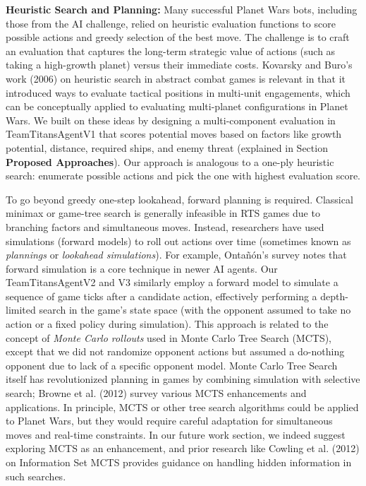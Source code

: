 \documentclass[conference]{IEEEtran}
\begin{document}
\textbf{Heuristic Search and Planning:} Many successful Planet Wars bots, including those from the AI challenge, relied on heuristic evaluation functions to score possible actions and greedy selection of the best move. The challenge is to craft an evaluation that captures the long-term strategic value of actions (such as taking a high-growth planet) versus their immediate costs. Kovarsky and Buro's work (2006) \cite{kovarsky2006} on heuristic search in abstract combat games is relevant in that it introduced ways to evaluate tactical positions in multi-unit engagements, which can be conceptually applied to evaluating multi-planet configurations in Planet Wars. We built on these ideas by designing a multi-component evaluation in TeamTitansAgentV1 that scores potential moves based on factors like growth potential, distance, required ships, and enemy threat (explained in Section \textbf{Proposed Approaches}). Our approach is analogous to a one-ply heuristic search: enumerate possible actions and pick the one with highest evaluation score.

To go beyond greedy one-step lookahead, forward planning is required. Classical minimax or game-tree search is generally infeasible in RTS games due to branching factors and simultaneous moves. Instead, researchers have used simulations (forward models) to roll out actions over time (sometimes known as \textit{plannings} or \textit{lookahead simulations}). For example, Ontañón's survey notes that forward simulation is a core technique in newer AI agents. Our TeamTitansAgentV2 and V3 similarly employ a forward model to simulate a sequence of game ticks after a candidate action, effectively performing a depth-limited search in the game's state space (with the opponent assumed to take no action or a fixed policy during simulation). This approach is related to the concept of \textit{Monte Carlo rollouts} used in Monte Carlo Tree Search (MCTS), except that we did not randomize opponent actions but assumed a do-nothing opponent due to lack of a specific opponent model. Monte Carlo Tree Search itself has revolutionized planning in games by combining simulation with selective search; Browne et al. (2012) \cite{browne2012} survey various MCTS enhancements and applications. In principle, MCTS or other tree search algorithms could be applied to Planet Wars, but they would require careful adaptation for simultaneous moves and real-time constraints. In our future work section, we indeed suggest exploring MCTS as an enhancement, and prior research like Cowling et al. (2012) \cite{cowling2012} on Information Set MCTS provides guidance on handling hidden information in such searches.
\end{document}
